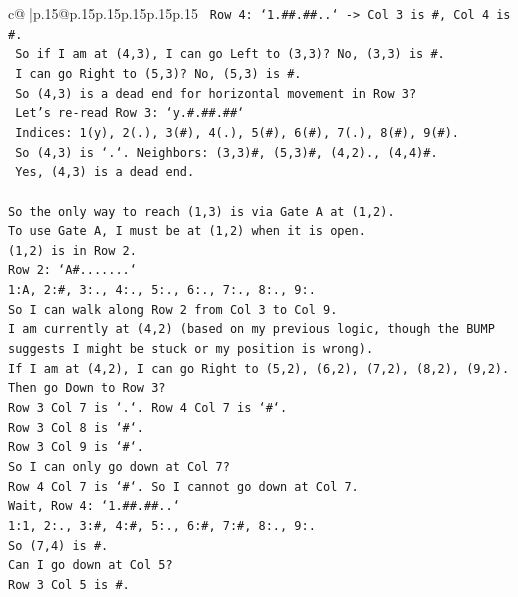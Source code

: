 \documentclass{article}
\begin{document}
{\begin{supertabular}{c@{$\;$}|p{.15\linewidth}@{}p{.15\linewidth}p{.15\linewidth}p{.15\linewidth}p{.15\linewidth}p{.15\linewidth}}
{{{\texttt{  Row 4: `1.\#\#.\#\#..` {-}> Col 3 is \#, Col 4 is \#.} \\
\texttt{  So if I am at (4,3), I can go Left to (3,3)? No, (3,3) is \#.} \\
\texttt{  I can go Right to (5,3)? No, (5,3) is \#.} \\
\texttt{  So (4,3) is a dead end for horizontal movement in Row 3?} \\
\texttt{  Let's re{-}read Row 3: `y.\#.\#\#.\#\#`} \\
\texttt{  Indices: 1(y), 2(.), 3(\#), 4(.), 5(\#), 6(\#), 7(.), 8(\#), 9(\#).} \\
\texttt{  So (4,3) is `.`. Neighbors: (3,3)\#, (5,3)\#, (4,2)., (4,4)\#.} \\
\texttt{  Yes, (4,3) is a dead end.} \\
\\ 
\texttt{So the only way to reach (1,3) is via Gate A at (1,2).} \\
\texttt{To use Gate A, I must be at (1,2) when it is open.} \\
\texttt{(1,2) is in Row 2.} \\
\texttt{Row 2: `A\#.......`} \\
\texttt{1:A, 2:\#, 3:., 4:., 5:., 6:., 7:., 8:., 9:.} \\
\texttt{So I can walk along Row 2 from Col 3 to Col 9.} \\
\texttt{I am currently at (4,2) (based on my previous logic, though the BUMP suggests I might be stuck or my position is wrong).} \\
\texttt{If I am at (4,2), I can go Right to (5,2), (6,2), (7,2), (8,2), (9,2).} \\
\texttt{Then go Down to Row 3?} \\
\texttt{Row 3 Col 7 is `.`. Row 4 Col 7 is `\#`.} \\
\texttt{Row 3 Col 8 is `\#`.} \\
\texttt{Row 3 Col 9 is `\#`.} \\
\texttt{So I can only go down at Col 7?} \\
\texttt{Row 4 Col 7 is `\#`. So I cannot go down at Col 7.} \\
\texttt{Wait, Row 4: `1.\#\#.\#\#..`} \\
\texttt{1:1, 2:., 3:\#, 4:\#, 5:., 6:\#, 7:\#, 8:., 9:.} \\
\texttt{So (7,4) is \#.} \\
\texttt{Can I go down at Col 5?} \\
\texttt{Row 3 Col 5 is \#.} \\
}}}
\end{supertabular}}
\end{document}
